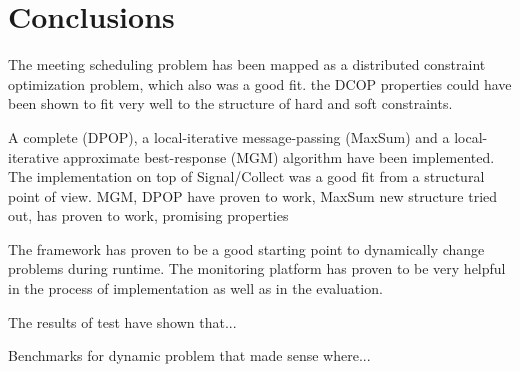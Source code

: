 \chapter{Conclusions}
\label{c:conclusions} 

The meeting scheduling problem has been mapped as a distributed constraint optimization problem, which also was a good fit. the DCOP properties could have been shown to fit very well to the structure of hard and soft constraints.

A complete (DPOP), a local-iterative message-passing (MaxSum) and a local-iterative approximate best-response (MGM) algorithm have been implemented. The implementation on top of Signal/Collect was a good fit from a structural point of view. 
MGM, DPOP have proven to work, MaxSum new structure tried out, has proven to work, promising properties

The framework has proven to be a good starting point to dynamically change problems during runtime. The monitoring platform has proven to be very helpful in the process of implementation as well as in the evaluation.

The results of test have shown that...

Benchmarks for dynamic problem that made sense where...

